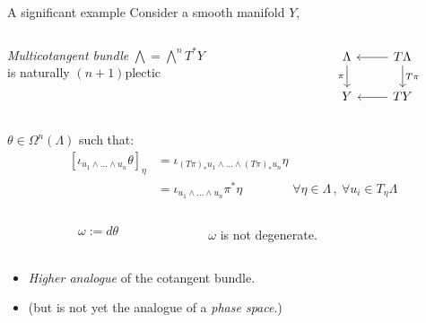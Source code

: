 \documentclass[handout,10pt]{beamer}
\begin{document}
  \begin{frame}[fragile]{A significant example} 
		Consider a smooth manifold $Y$,
		\begin{columns}
			\hfill
			\begin{column}{.5\linewidth}
				\emph{Multicotangent bundle} $\bigwedge = \bigwedge^n T^\ast Y$\\
				is naturally $(n+1)$plectic
			\end{column}
			\begin{column}{.4\linewidth}
				\[
				\begin{tikzcd}
					\Lambda \ar[d,"\pi"'] & T \Lambda \ar[d,"T \pi"] \ar[l] \\
					Y								& T Y \ar[l]
				\end{tikzcd}	
				\]
			\end{column}
		\end{columns}
	\vspace{2ex}
	\begin{defblock}
		$\theta \in \Omega^n(\Lambda)$ such that:
		\begin{displaymath}
		\begin{split}
			\left[ \iota_{u_1 \wedge \ldots \wedge u_n} \theta \right]_\eta 
			&= \iota_{(T \pi)_\ast u_1 \wedge \ldots \wedge (T \pi)_\ast u_n} \eta \\
			&= \iota_{u_1 \wedge \ldots \wedge u_n} \pi^\ast \eta 
			\qquad \qquad \forall \eta \in \Lambda \, , \: \forall u_i \in T_\eta \Lambda 		
		\end{split}
		\end{displaymath}
	\end{defblock}
		\begin{columns}
			\begin{column}{.6\linewidth}
				\begin{defblock}
					$$\omega := d \theta$$
				\end{defblock}
			\end{column}
			\begin{column}{.4\linewidth}
			 	\begin{claimblock}$\omega$ is not degenerate.\end{claimblock}	
			\end{column}
		\end{columns}	
		\vspace{2ex}
		\begin{itemize}
			\item \emph{Higher analogue} of the cotangent bundle.
			\item (but is not yet the analogue of a \emph{phase space}.)
		\end{itemize}
  \end{frame}
\end{document}
